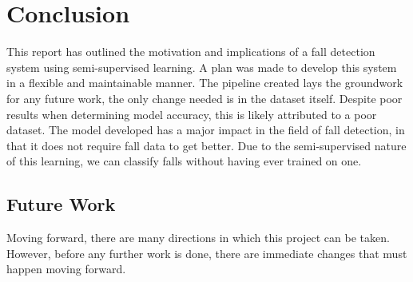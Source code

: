 \chapter{Conclusion}\label{ch:conclusion}

This report has outlined the motivation and implications of a fall detection system using semi-supervised learning. A plan was made to develop this system in a flexible and maintainable manner. The pipeline created lays the groundwork for any future work, the only change needed is in the dataset itself. Despite poor results when determining model accuracy, this is likely attributed to a poor dataset. The model developed has a major impact in the field of fall detection, in that it does not require fall data to get better. Due to the semi-supervised nature of this learning, we can classify falls without having ever trained on one.

\section{Future Work}

Moving forward, there are many directions in which this project can be taken. However, before any further work is done, there are immediate changes that must happen moving forward. 

